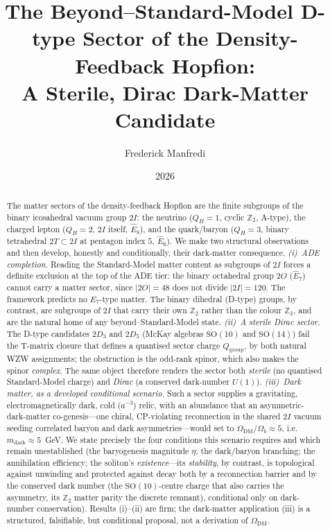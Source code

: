 \documentclass[11pt,a4paper]{article}
\title{\textbf{The Beyond--Standard-Model D-type Sector of the
Density-Feedback Hopfion:\\ A Sterile, Dirac Dark-Matter Candidate}}
\author{Frederick Manfredi}
\date{2026}
\theoremstyle{definition}\newtheorem{definition}[theorem]{Definition}
\theoremstyle{remark}
\newcommand{\SO}{\mathrm{SO}}
\newcommand{\twoI}{2I}
\newcommand{\twoT}{2T}
\newcommand{\twoO}{2O}
\newcommand{\twoD}{2D}
\newcommand{\QH}{Q_H}
\newcommand{\Qgr}{Q_{\mathrm{group}}}
\newcommand{\Ztwo}{\mathbb{Z}_2}
\newcommand{\Zthree}{\mathbb{Z}_3}
\newcommand{\Odm}{\Omega_{\mathrm{DM}}}
\newcommand{\Ob}{\Omega_{b}}
\begin{document}
\maketitle

\begin{abstract}
The matter sectors of the density-feedback Hopfion are the finite
subgroups of the binary icosahedral vacuum group $\twoI$: the neutrino
($\QH=1$, cyclic $\Ztwo$, A-type), the charged lepton ($\QH=2$, $\twoI$
itself, $\widehat{E}_8$), and the quark/baryon ($\QH=3$, binary
tetrahedral $\twoT\subset\twoI$ at pentagon index $5$, $\widehat{E}_6$).
We make two structural observations and then develop, honestly and
conditionally, their dark-matter consequence. \emph{(i)~ADE completion.}
Reading the Standard-Model matter content as subgroups of $\twoI$ forces
a definite exclusion at the top of the ADE tier: the binary octahedral
group $\twoO$ ($\widehat{E}_7$) cannot carry a matter sector, since
$|\twoO|=48$ does not divide $|\twoI|=120$. The framework predicts no
$E_7$-type matter. The binary dihedral (D-type) groups, by contrast, are
subgroups of $\twoI$ that carry their own $\Ztwo$ rather than the colour
$\Zthree$, and are the natural home of any beyond--Standard-Model state.
\emph{(ii)~A sterile Dirac sector.} The D-type candidates $\twoD_3$ and
$\twoD_5$ (McKay algebras $\SO(10)$ and $\SO(14)$) fail the T-matrix
closure that defines a quantised sector charge $\Qgr$, by both natural
WZW assignments; the obstruction is the odd-rank spinor, which also makes
the spinor \emph{complex}. The same object therefore renders the sector
both \emph{sterile} (no quantised Standard-Model charge) and
\emph{Dirac} (a conserved dark-number $U(1)$). \emph{(iii)~Dark matter,
as a developed conditional scenario.} Such a sector supplies a
gravitating, electromagnetically dark, cold ($a^{-3}$) relic, with an
abundance that an asymmetric-dark-matter co-genesis---one chiral,
CP-violating reconnection in the shared $\twoI$ vacuum seeding correlated
baryon and dark asymmetries---would set to $\Odm/\Ob\approx5$, i.e.\
$m_{\mathrm{dark}}\approx5$~GeV. We state precisely the four conditions
this scenario requires and which remain unestablished (the baryogenesis
magnitude $\eta$; the dark/baryon branching; the annihilation efficiency;
the soliton's \emph{existence}---its \emph{stability}, by contrast, is
topological against unwinding and protected against decay both by a
reconnection barrier and by the conserved dark number (the $\SO(10)$-centre
charge that also carries the asymmetry, its $\Ztwo$ matter parity the
discrete remnant), conditional only on dark-number conservation). Results
(i)--(ii) are firm; the dark-matter application (iii) is a structured,
falsifiable, but conditional proposal, not a derivation of $\Odm$.
\end{abstract}
\end{document}
